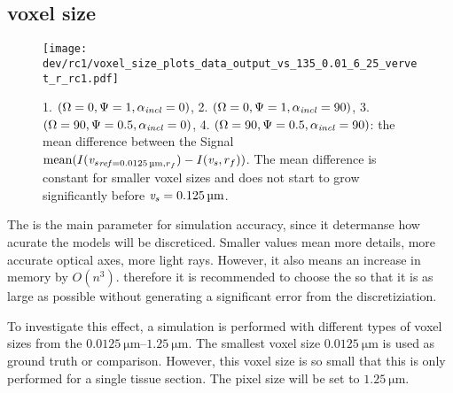 \subsection{voxel size \texorpdfstring{\voxels{}}{}}
% 
% 
\begin{figure}[!tp]%
\centering
\texttt{[image: dev/rc1/voxel\_size\_plots\_data\_output\_vs\_135\_0.01\_6\_25\_vervet\_r\_rc1.pdf]}
\caption[voxel size model with noise]{1. $(\textnormal{$\Omega$}=0, \textnormal{$\Psi$}=1, \textnormal{$\alpha_{\mathit{incl}}$}=0)$, 2. $(\textnormal{$\Omega$}=0, \textnormal{$\Psi$}=1, \textnormal{$\alpha_{\mathit{incl}}$}=90)$, 3. $(\textnormal{$\Omega$}=90, \textnormal{$\Psi$}=0.5, \textnormal{$\alpha_{\mathit{incl}}$}=0)$, 4. $(\textnormal{$\Omega$}=90, \textnormal{$\Psi$}=0.5, \textnormal{$\alpha_{\mathit{incl}}$}=90)$: the mean difference between the Signal $\mean(\intensity(\voxels_{\mathit{ref} = \SI{0.0125}{\micro\meter}, \fiberRadius})- \intensity(\voxels, \fiberRadius))$. The mean difference is constant for smaller voxel sizes and does not start to grow significantly before $\voxels=\SI{0.125}{\micro\meter}$. }
\label{fig:voxelsizeNoise}
\end{figure}
% 
The \voxelsize{} \voxels{} is the main parameter for simulation accuracy, since it determanse how acurate the models will be discreticed.
Smaller values mean more details, more accurate optical axes, more light rays.
However, it also means an increase in memory by $O(n^3)$.
therefore it is recommended to choose the \voxelsize{} so that it is as large as possible without generating a significant error from the discretiziation.
\par
% 
To investigate this effect, a simulation is performed with different types of voxel sizes from the $\SIrange{0.0125}{1.25}{\micro\meter}$.
The smallest voxel size $\SI{0.0125}{\micro\meter}$ is used as ground truth or comparison. 
However, this voxel size is so small that this is only performed for a single tissue section. 
The pixel size \pixelsize{} will be set to $\SI{1.25}{\micro\meter}$. 
% 
